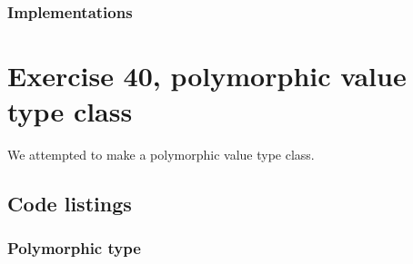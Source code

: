 \documentclass[11pt]{article}
\begin{document}
\subsubsection*{Implementations}












\section*{Exercise 40, polymorphic value type class}
We attempted to make a polymorphic value type class.

\subsection*{Code listings}











\subsubsection*{Polymorphic type}




\end{document}
